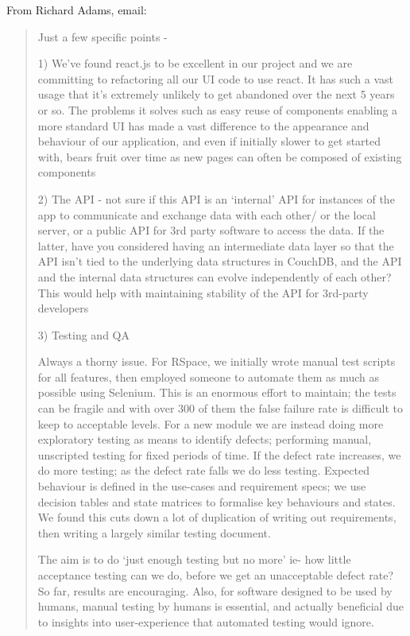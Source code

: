 \documentclass[a4paper,headings=small fontsize=10pt]{scrreprt}
\begin{document}
From Richard Adams, email:
\begin{quote}
Just a few specific points -

1) We've found react.js to be excellent in our project and we are
committing to refactoring all our UI code to use react. It has such a
vast usage that it's extremely unlikely to get abandoned over the next 5
years or so. The problems it solves such as easy reuse of components
enabling a more standard UI has made a vast difference to the appearance
and behaviour of our application, and even if initially slower to get
started with, bears fruit over time as new pages can often be composed
of existing components

2) The API - not sure if this API is an `internal' API for instances of
the app to communicate and exchange data with each other/ or the local
server, or a public API for 3rd party software to access the data. If
the latter, have you considered having an intermediate data layer so
that the API isn't tied to the underlying data structures in CouchDB,
and the API and the internal data structures can evolve independently of
each other? This would help with maintaining stability of the API for
3rd-party developers

3) Testing and QA

 Always a thorny issue. For RSpace, we initially wrote manual test
  scripts for all features, then employed someone to automate them as
  much as possible using Selenium. This is an enormous effort to
  maintain; the tests can be fragile and with over 300 of them the false
  failure rate is difficult to keep to acceptable levels. For a new
  module we are instead doing more exploratory testing as means to
  identify defects; performing manual, unscripted testing for fixed
  periods of time. If the defect rate increases, we do more testing; as
  the defect rate falls we do less testing. Expected behaviour is
  defined in the use-cases and requirement specs; we use decision tables
  and state matrices to formalise key behaviours and states. We found
  this cuts down a lot of duplication of writing out requirements, then
  writing a largely similar testing document.
 
The aim is to do `just enough testing but no more' ie- how little
  acceptance testing can we do, before we get an unacceptable defect
  rate? So far, results are encouraging. Also, for software designed to
  be used by humans, manual testing by humans is essential, and actually
  beneficial due to insights into user-experience that automated testing
  would ignore.
 

\end{quote}
\end{document}
